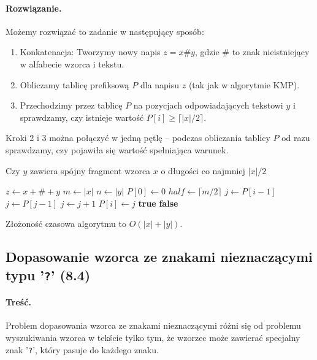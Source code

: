 \paragraph{Rozwiązanie.}
Możemy rozwiązać to zadanie w następujący sposób:

\begin{enumerate}
	\item Konkatenacja: Tworzymy nowy napis $z = x \# y$, gdzie $\#$ to znak nieistniejący w alfabecie wzorca i tekstu.
	\item Obliczamy tablicę prefiksową $P$ dla napisu $z$ (tak jak w algorytmie KMP).
	\item Przechodzimy przez tablicę $P$ na pozycjach odpowiadających tekstowi $y$ i sprawdzamy, czy istnieje wartość $P[i] \geq \lceil |x|/2 \rceil$.
\end{enumerate}

Kroki 2 i 3 można połączyć w jedną pętlę -- podczas obliczania tablicy $P$ od razu sprawdzamy, czy pojawiła się wartość spełniająca warunek.

\begin{algorithm}[H]
	\caption{Czy $y$ zawiera spójny fragment wzorca $x$ o długości co najmniej $|x|/2$}
	\begin{algorithmic}[1]
			\State $z \gets x + \# + y$ 
			\State $m \gets |x|$
			\State $n \gets |y|$
			\State $P[0] \gets 0$
			\State $half \gets \lceil m/2 \rceil$
				\State $j \gets P[i-1]$
					\State $j \gets P[j-1]$
				\EndWhile
					\State $j \gets j + 1$
				\EndIf
				\State $P[i] \gets j$
					\State \Return \textbf{true}
				\EndIf
			\EndFor
			\State \Return \textbf{false}
		\EndProcedure
	\end{algorithmic}
\end{algorithm}

Złożoność czasowa algorytmu to $O(|x| + |y|)$.

\subsection{Dopasowanie wzorca ze znakami nieznaczącymi typu '\texttt{?}' (8.4)}
\label{zadanie8.4}
\paragraph{Treść.}
Problem dopasowania wzorca ze znakami nieznaczącymi różni się od problemu wyszukiwania wzorca w tekście tylko tym, że wzorzec może zawierać specjalny znak '\texttt{?}', który pasuje do każdego znaku.

